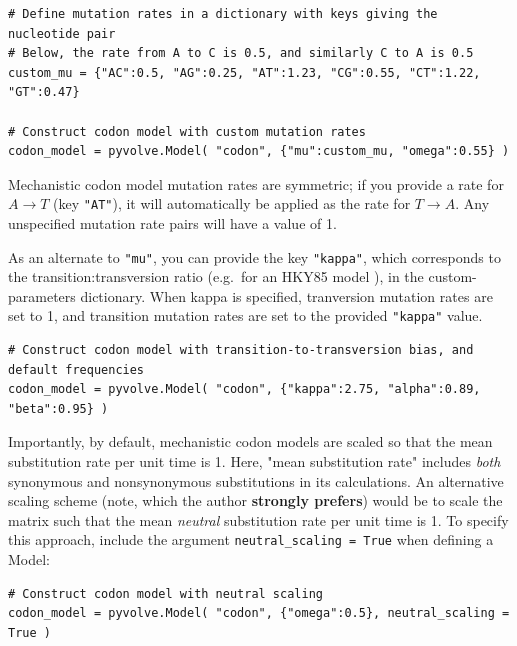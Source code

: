 \documentclass{article}
\newcommand{\code}[1]{\texttt{\small{#1}}}
\begin{document}
\begin{lstlisting}
# Define mutation rates in a dictionary with keys giving the nucleotide pair
# Below, the rate from A to C is 0.5, and similarly C to A is 0.5
custom_mu = {"AC":0.5, "AG":0.25, "AT":1.23, "CG":0.55, "CT":1.22, "GT":0.47} 

# Construct codon model with custom mutation rates
codon_model = pyvolve.Model( "codon", {"mu":custom_mu, "omega":0.55} )
\end{lstlisting}


Mechanistic codon model mutation rates are symmetric; if you provide a rate for $A \rightarrow T$ (key \code{"AT"}), it will automatically be applied as the rate for $T \rightarrow A$. Any unspecified mutation rate pairs will have a value of 1.

As an alternate to \code{"mu"}, you can provide the key \code{"kappa"}, which corresponds to the transition:transversion ratio (e.g.\ for an HKY85  model \citep{HKY85}), in the custom-parameters dictionary. When kappa is specified, tranversion mutation rates are set to 1, and transition mutation rates are set to the provided \code{"kappa"} value.

\begin{lstlisting}
# Construct codon model with transition-to-transversion bias, and default frequencies
codon_model = pyvolve.Model( "codon", {"kappa":2.75, "alpha":0.89, "beta":0.95} )
\end{lstlisting}

Importantly, by default, mechanistic codon models are scaled so that the mean substitution rate per unit time is 1. Here, "mean substitution rate" includes \emph{both} synonymous and nonsynonymous substitutions in its calculations. An alternative scaling scheme (note, which the author \textbf{strongly prefers}) would be to scale the matrix such that the mean \emph{neutral} substitution rate per unit time is 1. To specify this approach, include the argument \code{neutral\_scaling = True} when defining a Model:
\begin{lstlisting}
# Construct codon model with neutral scaling
codon_model = pyvolve.Model( "codon", {"omega":0.5}, neutral_scaling = True )
\end{lstlisting}
\end{document}
